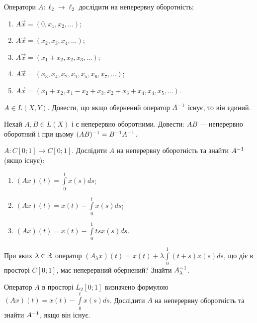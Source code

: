 
\begin{exercise}
    Оператори $A: \ell_2 \to \ell_2$ дослідити на неперервну оборотність:
    \begin{enumerate}
        \item $A\vec{x} = (0, x_1, x_2, ...)$;
        \item $A\vec{x} = (x_2, x_3, x_4, ...)$;
        \item $A\vec{x} = (x_1+x_2, x_2, x_3, ...)$;
        \item $A\vec{x} = (x_3, x_4, x_2, x_1, x_5, x_6, x_7, ...)$;
        \item $A\vec{x} = (x_1+x_2, x_1 - x_2 + x_3, x_2 + x_3 + x_4, x_4, x_5, ...)$.
    \end{enumerate}
\end{exercise}

\begin{exercise}
    $A \in L(X, Y)$. Довести, що якщо обернений оператор $A^{-1}$
    існує, то він єдиний.
\end{exercise}

\begin{exercise}
    Нехай $A, B \in L(X)$ і є неперервно оборотними.
    Довести: $AB$ --- неперервно оборотний і при цьому $(AB)^{-1} = B^{-1} A^{-1}$.
\end{exercise}

\begin{exercise}\label{N:1_6_16}
    $A: C[0;1] \to C[0;1]$. Дослідити $A$ на неперервну оборотність та знайти $A^{-1}$ (якщо існує):
    \begin{enumerate}
        \item $(Ax)(t) = \int\limits_0^t x(s)ds$;
        \item $(Ax)(t) = x(t) - \int\limits_0^t x(s)ds$;
        \item $(Ax)(t) = x(t) - \int\limits_0^1 t s x(s) ds$.
    \end{enumerate}
\end{exercise}

\begin{exercise}\label{N:1_6_17}
    При яких $\lambda \in \mathbb{R}$ оператор $(A_\lambda x)(t) = x(t) + \lambda \int\limits_0^1 (t+s) x(s) ds$,
    що діє в просторі $C[0;1]$, має неперервний обернений? Знайти $A_\lambda^{-1}$.
\end{exercise}

\begin{exercise}
    Оператор $A$ в просторі $L_2 [0;1]$ визначено формулою $(Ax)(t) = x(t) - \int\limits_0^t x(s) ds$.
    Дослідити $A$ на неперервну оборотність та знайти $A^{-1}$, якщо він існує.
\end{exercise}

